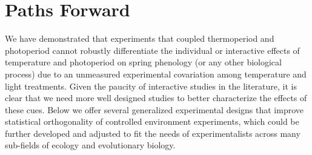 \documentclass[11pt]{article}
\begin{document}
\section*{Paths Forward}
We have demonstrated that experiments that coupled thermoperiod and photoperiod cannot robustly differentiate the individual or interactive effects of temperature and photoperiod on spring phenology (or any other biological process) due to an unmeasured experimental covariation among temperature and light treatments. Given the paucity of interactive studies in the literature, it is clear that we need more well designed studies to better characterize the effects of these cues. Below we offer several generalized experimental designs that improve statistical orthogonality of controlled environment experiments, which could be further developed and adjusted to fit the needs of experimentalists across many sub-fields of ecology and evolutionary biology. 
\end{document}
